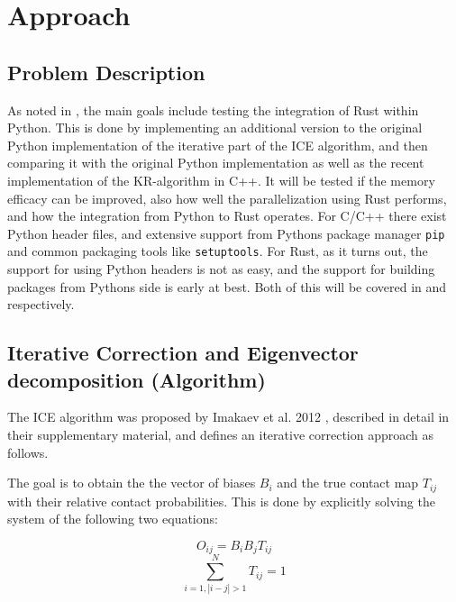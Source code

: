 \chapter{Approach}\label{chap:approach}



\section{Problem Description}\label{sec:problem}

As noted in , the main goals include testing the integration
of Rust within Python. This is done by implementing an additional version to
the original Python implementation of the iterative part of the ICE algorithm,
and then comparing it with the original Python implementation as well as the
recent implementation of the KR-algorithm in C++. It will be tested if the
memory efficacy can be improved, also how well the parallelization using Rust
performs, and how the integration from Python to Rust operates. For C/C++
there exist Python header files, and extensive support from Pythons package
manager \verb|pip| and common packaging tools like \verb|setuptools|. For Rust,
as it turns out, the support for using Python headers is not as easy, and the
support for building packages from Pythons side is early at best. Both of this
will be covered in  and  respectively.



\section{Iterative Correction and Eigenvector decomposition (Algorithm)}\label{sec:ICE}

The ICE algorithm was proposed by Imakaev et al. 2012
\cite{imakaev2012iterative}, described in detail in their supplementary
material, and defines an iterative correction approach as follows.

The goal is to obtain the the vector of biases $B_i$ and the true contact map
$T_{ij}$ with their relative contact probabilities. This is done by explicitly
solving the system of the following two equations:

\begin{equation} \label{eq:1}
O_{ij} = B_i B_j T_{ij}
\end{equation}
\begin{equation} \label{eq:2}
\sum^N_{i=1, |i-j|>1} T_{ij} = 1
\end{equation}

